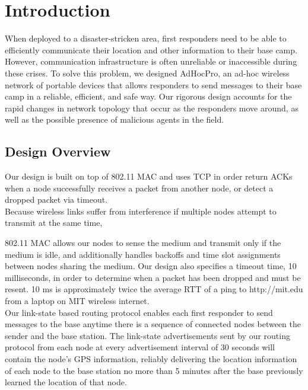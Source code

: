 \documentclass[letterpaper]{article}
\begin{document}
\section{Introduction}

When deployed to a disaster-stricken area, first responders need to be able to efficiently communicate their
location and other information to their base camp. However, communication infrastructure is often unreliable
or inaccessible during these crises. To solve this problem, we designed AdHocPro, an ad-hoc wireless network of
portable devices that allows responders to send messages to their base camp in a reliable, efficient, and safe
way. Our rigorous design accounts for the rapid changes in network topology that occur as the responders move 
around, as well as the possible presence of malicious agents in the field. 

\subsection{Design Overview}

Our design is built on top of 802.11 MAC and uses TCP in order return ACKs when a node successfully receives
a packet from another node, or detect a dropped packet via timeout.
\\

\noindent Because wireless links suffer from interference if multiple nodes attempt to transmit at the same time,

802.11 MAC allows our nodes to sense the medium and transmit only if the medium is idle, and additionally handles
backoffs and time slot assignments between nodes sharing the medium. Our design also specifies a timeout time, 
10 milliseconds, in order to determine when a packet has been dropped and must be resent. 10 ms is approximately 
twice the average RTT of a ping to http://mit.edu from a laptop on MIT wireless internet.
\\

\noindent Our link-state based routing protocol enables each first responder to send messages to the base anytime
there is a sequence of connected nodes between the sender and the base station. The link-state advertisements 
sent by our routing protocol from each node at every advertisement interval of 30 seconds will contain the node's
GPS  information, reliably delivering the location information of each node to the base station no more than
5 minutes after the base previously learned the location of that node.
\\
\end{document}
